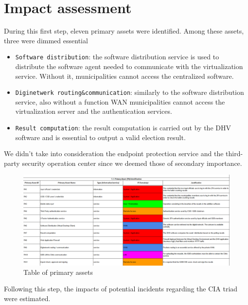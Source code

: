 \section*{Impact assessment}

During this first step, eleven primary assets were identified. Among these assets, three were dimmed essential

\begin{itemize}
    \item \texttt{Software distribution}: the software distribution service is used to distribute the software agent needed to communicate with the virtualization service. Without it, municipalities cannot access the centralized software.
    \item \texttt{Diginetwerk routing\&communication}: similarly to the software distribution service, also without a function WAN municipalities cannot access the virtualization server and the authentication services.
    \item \texttt{Result computation}: the result computation is carried out by the DHV software and is essential to output a valid election result.
\end{itemize}

We didn't take into consideration the endpoint protection service and the third-party security operation center since we deemed those of secondary importance.

\begin{figure}[ht!]
    \centering
    \includegraphics[keepaspectratio,width=1\textwidth]{03-risk-analysis/001-IA/img/PRASS.png}
    \caption{Table of primary assets}
    \label{fig:paTable}
\end{figure}

Following this step, the impacts of potential incidents regarding the CIA triad were estimated.

